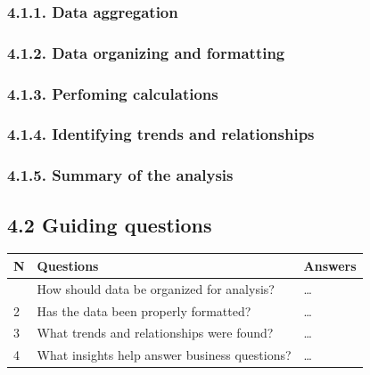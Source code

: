 \documentclass[
]{article}
\begin{document}
\subsubsection{\texorpdfstring{\textbf{4.1.1. Data
aggregation}}{4.1.1. Data aggregation}}\label{data-aggregation}

\subsubsection{\texorpdfstring{\textbf{4.1.2. Data organizing and
formatting}}{4.1.2. Data organizing and formatting}}\label{data-organizing-and-formatting}

\subsubsection{\texorpdfstring{\textbf{4.1.3. Perfoming
calculations}}{4.1.3. Perfoming calculations}}\label{perfoming-calculations}

\subsubsection{\texorpdfstring{\textbf{4.1.4. Identifying trends and
relationships}}{4.1.4. Identifying trends and relationships}}\label{identifying-trends-and-relationships}

\subsubsection{\texorpdfstring{\textbf{4.1.5. Summary of the
analysis}}{4.1.5. Summary of the analysis}}\label{summary-of-the-analysis}

\subsection{\texorpdfstring{\textbf{4.2 Guiding
questions}}{4.2 Guiding questions}}\label{guiding-questions-2}

\begin{longtable}[]{@{}lll@{}}
\toprule\noalign{}
N & Questions & Answers \\
\midrule\noalign{}
\endhead
\bottomrule\noalign{}
\endlastfoot
1 & How should data be organized for analysis? & \ldots{} \\
2 & Has the data been properly formatted? & \ldots{} \\
3 & What trends and relationships were found? & \ldots{} \\
4 & What insights help answer business questions? & \ldots{} \\
\end{longtable}
\end{document}
